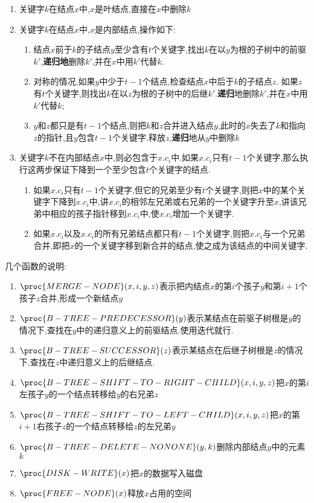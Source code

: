 \documentclass[12pt]{article}
\begin{document}
	\begin{enumerate}
		\item 关键字$k$在结点$x$中,$x$是叶结点,直接在$x$中删除$k$
		\item 关键字$k$在结点$x$中,$x$是内部结点,操作如下:
		\begin{enumerate}
			\item 结点$x$前于$k$的子结点$y$至少含有$t$个关键字,找出$k$在以$y$为根的子树中的前驱$k'$,\textbf{递归地}删除$k'$,并在$x$中用$k'$代替$k$.
			\item 对称的情况,如果$y$中少于$t-1$个结点,检查结点$x$中后于$k$的子结点$z$.
			如果$z$有$t$个关键字,则找出$k$在以$z$为根的子树中的后继$k'$.\textbf{递归}地删除$k'$,并在$x$中用$k'$代替$k$;
			\item $y$和$z$都只是有$t-1$个结点,则把$k$和$z$合并进入结点$y$,此时的$x$失去了$k$和指向$z$的指针,且$y$包含$t-1$个关键字.释放$z$,\textbf{递归}地从$y$中删除$k$
		\end{enumerate}
		\item 关键字$k$不在内部结点$x$中,则必包含于$x.c_i$中.如果$x.c_i$只有$t-1$个关键字,那么执行这两步保证下降到一个至少包含$t$个关键字的结点.
		
		\begin{enumerate}
			\item 如果$x.c_i$只有$t-1$个关键字,但它的兄弟至少有$t$个关键字,则把$x$中的某个关键字下降到$x.c_i$中,讲$x.c_i$的相邻左兄弟或右兄弟的一个关键字升至$x$,讲该兄弟中相应的孩子指针移到$x.c_i$中,使$x.c_i$增加一个关键字.
			\item 如果$x.c_i$以及$x.c_i$的所有兄弟结点都只有$t-1$个关键字,则把$x.c_i$与一个兄弟合并,即把$x$的一个关键字移到新合并的结点,使之成为该结点的中间关键字.
		\end{enumerate}
	\end{enumerate}
	几个函数的说明:
	\begin{enumerate}
		\item $\proc{MERGE-NODE}(x,i,y,z)$表示把内结点$x$的第$i$个孩子$y$和第$i+1$个孩子$z$合并,形成一个新结点$y$
		\item $\proc{B-TREE-PREDECESSOR}(y)$表示某结点在前驱子树根是$y$的情况下,查找在$y$中的递归意义上的前驱结点.使用迭代就行.
		\item $\proc{B-TREE-SUCCESSOR}(z)$表示某结点在后继子树根是$z$的情况下,查找在$z$中递归意义上的后继结点.
		\item $\proc{B-TREE-SHIFT-TO-RIGHT-CHILD}(x,i,y,z)$把$x$的第$i$左孩子$y$的一个结点转移给$y$的右兄弟$z$
		\item $\proc{B-TREE-SHIFT-TO-LEFT-CHILD}(x,i,y,z)$把$x$的第$i+1$右孩子$z$的一个结点转移给$z$的左兄弟$y$
		\item $\proc{B-TREE-DELETE-NONONE}(y,k)$删除内部结点$y$中的元素$k$
		\item $\proc{DISK-WRITE}(x)$把$x$的数据写入磁盘
		\item $\proc{FREE-NODE}(x)$释放$x$占用的空间
	\end{enumerate}
\end{document}
